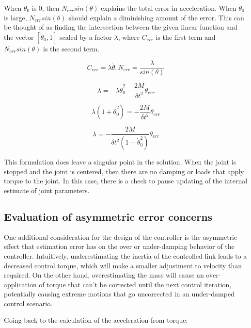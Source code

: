 When $\dot{\theta}_{0}$ is 0, then $N_{err} sin(\theta)$ explains the total error in acceleration. When $\dot{\theta}_{0}$ is large, $N_{err} sin(\theta)$ should explain a diminishing amount of the error. This can be thought of as finding the intersection between the given linear function and the vector $[\dot{\theta}_{0}, 1]$ scaled by a factor $\lambda$, where $C_{err}$ is the first term and 
$N_{err} sin(\theta)$ is the second term.

\begin{equation}
C_{err} = \lambda \dot{\theta}, N_{err} = \dfrac{\lambda}{sin(\theta)}
\end{equation}

\begin{equation}
\lambda = 
- \lambda \dot{\theta}_{0}^{2}
- \dfrac{2M}{\delta t^{2}} \theta_{err}
\end{equation}

\begin{equation}
\lambda (1
+ \dot{\theta}_{0}^{2})
=
- \dfrac{2M}{\delta t^{2}} \theta_{err}
\end{equation}

\begin{equation}
\lambda 
=
- \dfrac{2M}{\delta t^{2} (1 + \dot{\theta}_{0}^{2})} \theta_{err}
\end{equation}

This formulation does leave a singular point in the solution. When the joint is stopped and the joint is centered, then there are no damping or loads that apply torque to the joint. In this case, there is a check to pause updating of the internal estimate of joint parameters.

\subsection{Evaluation of asymmetric error concerns}

One additional consideration for the design of the controller is the asymmetric
effect that estimation error has on the over or under-damping behavior of the
controller. Intuitively,
underestimating the inertia of the controlled link leads to a decreased control
torque, which will make a smaller adjustment to velocity than required. On the
other hand, overestimating the mass will cause an over-application of torque
that can't be corrected until the next control iteration, potentially causing
extreme motions that go uncorrected in an under-damped control scenario.

Going back to the calculation of the acceleration from torque:

